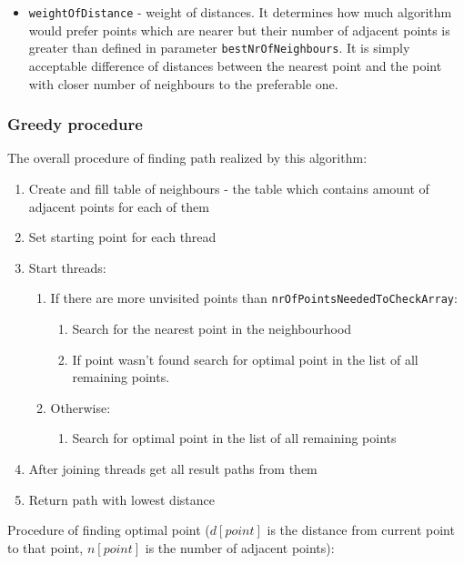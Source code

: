 \documentclass[titlepage]{article}
\begin{document}
\begin{itemize}
	\item \texttt{weightOfDistance} - weight of distances. It determines how much algorithm would prefer points which are nearer but their number of adjacent points is greater than defined in parameter \texttt{bestNrOfNeighbours}. It is simply acceptable difference of distances between the nearest point and the point with closer number of neighbours to the preferable one.
	
\end{itemize}

\subsubsection{Greedy procedure}

The overall procedure of finding path realized by this algorithm:

\begin{enumerate}
	\item Create and fill table of neighbours - the table which contains amount of adjacent points for each of them
	\item Set starting point for each thread
	\item Start threads:
	\begin{enumerate}[label*=\arabic*.]
		\item If there are more unvisited points than \texttt{nrOfPointsNeededToCheckArray}:
		\begin{enumerate}[label*=\arabic*.]
			\item Search for the nearest point in the neighbourhood
			\item If point wasn't found search for optimal point in the list of all remaining points.
		\end{enumerate}
		\item Otherwise:
		\begin{enumerate}[label*=\arabic*.]
			\item Search for optimal point in the list of all remaining points
		\end{enumerate}
	\end{enumerate}
	\item After joining threads get all result paths from them
	\item Return path with lowest distance
\end{enumerate}

Procedure of finding optimal point ($d[point]$ is the distance from current point to that point, $n[point]$ is the number of adjacent points):
\end{document}
